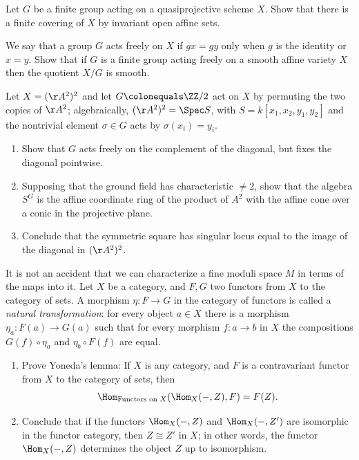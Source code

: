 \begin{exercise}\label{quotient of projective}
 Let $G$ be a
finite group acting
%
on a
quasiprojective scheme
%
$X$.
Show that there is a finite covering of $X$ by invariant open affine sets.
\end{exercise}

\begin{exercise}\label{free actions}
We say that a group $G$ acts freely on $X$ if $gx = gy$ only when $g$ is the identity or $x=y$. Show that
 if $G$ is a finite
group acting freely
%
on a smooth affine variety $X$ then the
quotient
%
$X/G$ is smooth.
\end{exercise}


\begin{exercise}
 \label{sym2A2}
 Let $X = (\AA^{2})^{2}$ and let $G \colonequals \ZZ/2$ act on $X$ by permuting the two copies of  $\AA^{2}$; algebraically,
$(\AA^{2})^{2} = \Spec S$, with $S = k[x_{1},x_{2}, y_{1}, y_{2}]$ and the nontrivial element $\sigma\in G$ acts by
$\sigma(x_{i}) = y_{i}$.
 \begin{enumerate}
\item Show that $G$ acts freely on the complement of the diagonal, but fixes the diagonal pointwise.
\item Supposing that the ground field has characteristic $\neq 2$,
show that the algebra $S^{G}$ is the affine
coordinate ring
%
of the product
of $A^2$ with the affine cone over a conic in the projective plane.
\item Conclude that the
symmetric square
%
has singular locus equal to the image of the diagonal in
$(\AA^{2})^{2}$.
\end{enumerate}\label{tnih5.2}
\end{exercise}

\begin{exercise}\label{Yoneda}
It is not an accident that we can characterize a
fine moduli space
%
$M$ in terms of the maps into it.
 Let $X$ be a category, and $F,G$ two functors from $X$ to the category of sets.
 A morphism $\eta: F\to G$ in the category of functors is called a
\emph{natural transformation}:
%
 for every object $a\in X$ there is a morphism $\eta_a:F(a) \to G(a)$ such that for every
 morphism $f: a\to b$ in $X$ the compositions $G(f)\circ \eta_a$ and $\eta_b\circ F(f)$
 are equal.
\begin{enumerate}
 \item Prove Yoneda's lemma:
%
If $X$ is any category, and $F$ is a contravariant functor from $X$ to the category of sets, then
 $$
 \Hom_{\hbox{\scriptsize Functors on $X$}}(\Hom_X( -, Z), F) = F(Z)
.
 $$
 \item Conclude that if the functors $\Hom_X( -, Z)$ and $\Hom_X( -, Z')$ are isomorphic in the functor category,
 then $Z \cong Z'$ in $X$;
in other words,
the functor $\Hom_X( -, Z)$ determines the object $Z$ up to isomorphism.
 \end{enumerate}
\end{exercise}

